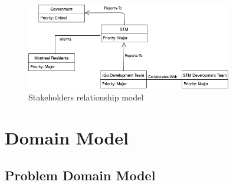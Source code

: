 \documentclass[11pt, english]{report}
\begin{document}
  \begin{figure}[H]
  
  \includegraphics[width=0.8\textwidth]{images/stake_relationship.png}
  \centering
  \caption{ Stakeholders relationship model}

\end{figure}



\chapter{Domain Model}
\section{Problem Domain Model}
\end{document}
